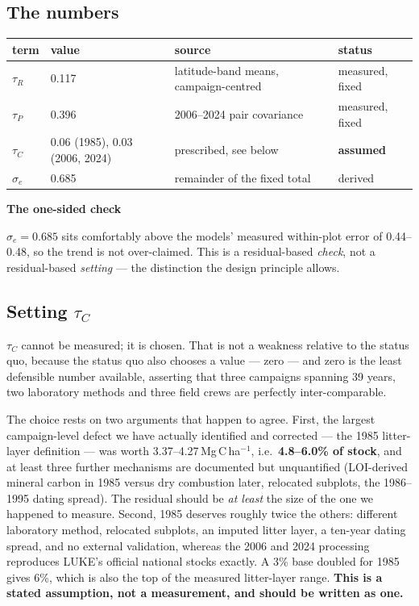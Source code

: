 \documentclass[11pt]{article}
\newenvironment{keybox}[1][]{%
  \begin{leftbar}\noindent\textbf{\small #1}\par\vspace{0.3em}\small}{\end{leftbar}}
\begin{document}
\subsection{The numbers}

\begin{center}
\begin{tabular}{llll}
\toprule
term & value & source & status \\
\midrule
$\tau_R$   & 0.117 & latitude-band means, campaign-centred & measured, fixed \\
$\tau_P$   & 0.396 & 2006--2024 pair covariance & measured, fixed \\
$\tau_C$   & 0.06 (1985), 0.03 (2006, 2024) & prescribed, see below & \textbf{assumed} \\
$\sigma_e$ & 0.685 & remainder of the fixed total & derived \\
\bottomrule
\end{tabular}
\end{center}

\begin{keybox}[The one-sided check]
$\sigma_e = 0.685$ sits comfortably above the models' measured within-plot error of
0.44--0.48, so the trend is not over-claimed. This is a residual-based
\emph{check}, not a residual-based \emph{setting} --- the distinction the design
principle allows.
\end{keybox}

\subsection{Setting $\tau_C$}
\label{sec:campaign}

$\tau_C$ cannot be measured; it is chosen. That is not a weakness relative to the
status quo, because the status quo also chooses a value --- zero --- and zero is the
least defensible number available, asserting that three campaigns spanning 39 years,
two laboratory methods and three field crews are perfectly inter-comparable.

The choice rests on two arguments that happen to agree. First, the largest
campaign-level defect we have actually identified and corrected --- the 1985
litter-layer definition --- was worth 3.37--4.27\,Mg\,C\,ha$^{-1}$, i.e.\
\textbf{4.8--6.0\% of stock}, and at least three further mechanisms are documented
but unquantified (LOI-derived mineral carbon in 1985 versus dry combustion later,
relocated subplots, the 1986--1995 dating spread). The residual should be
\emph{at least} the size of the one we happened to measure. Second, 1985 deserves
roughly twice the others: different laboratory method, relocated subplots, an
imputed litter layer, a ten-year dating spread, and no external validation, whereas
the 2006 and 2024 processing reproduces LUKE's official national stocks exactly.
A 3\% base doubled for 1985 gives 6\%, which is also the top of the measured
litter-layer range. \textbf{This is a stated assumption, not a measurement, and
should be written as one.}
\end{document}
